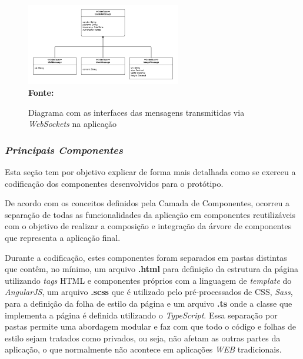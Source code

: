 \begin{figure}[ht]
	\centering	
	\caption[\hspace{0.1cm}Diagrama com as interfaces das mensagens transmitidas via \textit{WebSockets} na aplicação.]{Diagrama com as interfaces das mensagens transmitidas via \textit{WebSockets} na aplicação}
	\vspace{-0.4cm}
	\includegraphics[width=0.6\textwidth]{figuras/SocketInterfaces.png}
	\vspace{-0.2cm}
	\\\textbf{\footnotesize Fonte: \cite{pressman2011} }
	\label{fig:figura2}
\end{figure}
\vspace{-0.5cm}

\subsubsection{{\it Principais Componentes}}
Esta seção tem por objetivo explicar de forma mais detalhada como se exerceu a codificação dos componentes desenvolvidos para o protótipo.

De acordo com os conceitos definidos pela Camada de Componentes, ocorreu a separação de todas as funcionalidades da aplicação em componentes reutilizáveis com o objetivo de realizar a composição e integração da árvore de componentes que representa a aplicação final.

Durante a codificação, estes componentes foram separados em pastas distintas que contêm, no mínimo, um arquivo \textbf{.html} para definição da estrutura da página utilizando \textit{tags} HTML e componentes próprios com a linguagem de \textit{template} do \textit{AngularJS}, um arquivo \textbf{.scss} que é utilizado pelo pré-processados de CSS, \textit{Sass}, para a definição da folha de estilo da página e um arquivo \textbf{.ts} onde a classe que implementa a página é definida utilizando o \textit{TypeScript}. Essa separação por pastas permite uma abordagem modular e faz com que todo o código e folhas de estilo sejam tratados como privados, ou seja, não afetam as outras partes da aplicação, o que normalmente não acontece em aplicações \textit{WEB} tradicionais.

